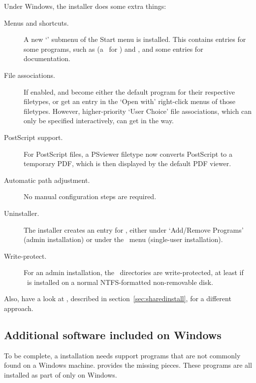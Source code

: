 \documentclass[12pt]{article}
\begin{document}
Under Windows, the installer does some extra things:
\begin{description}
\item[Menus and shortcuts.] A new `\TL{}' submenu of the Start menu
  is installed. This contains entries for some \GUI{} programs, such
  as  (a \GUI\ for ) and , and some
  entries for documentation.

\item[File associations.] If enabled,  and 
  become either the default program for
  their respective filetypes, or get an entry in the `Open with'
  right-click menus of those filetypes. However,
  higher-priority `User Choice' file associations, which can only be
  specified interactively, can get in the way.

\item[PostScript support.] For PostScript files, a PSviewer filetype
  now converts PostScript to a temporary PDF, which is then
  displayed by the default PDF viewer.

\item[Automatic path adjustment.] No manual configuration steps are required.

\item[Uninstaller.] The installer creates an entry for \TL, either
  under `Add/Remove Programs' (admin installation) or under the
  \TL\ menu (single-user installation).

\item[Write-protect.] For an admin installation, the \TL\ directories are
  write-protected, at least if \TL\ is installed on a normal
  NTFS-formatted non-removable disk.
\end{description}

Also, have a look at , described in
section~\ref{sec:sharedinstall}, for a different approach.

\subsection{Additional software included on Windows}

To be complete, a \TL{} installation needs support programs that are not
commonly found on a Windows machine. \TL{} provides the missing pieces.
These programs are all installed as part of \TL{} only on Windows.
\end{document}
